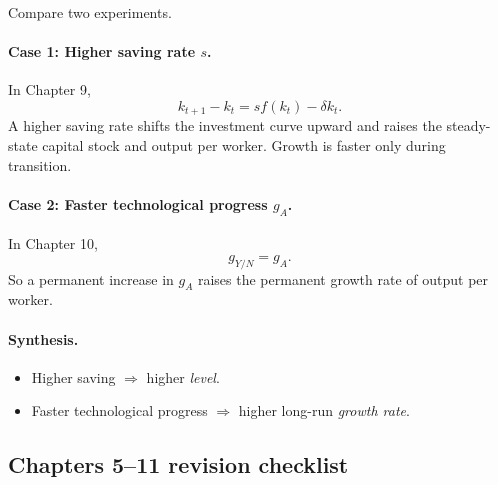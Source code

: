 \documentclass[12pt]{article}
\begin{document}
\begin{examplebox}[title={Worked Example: Higher saving rate versus faster technological progress}]
Compare two experiments.

\paragraph{Case 1: Higher saving rate \(s\).}
In Chapter 9,
\[
k_{t+1}-k_t=s f(k_t)-\delta k_t.
\]
A higher saving rate shifts the investment curve upward and raises the steady-state capital stock and output per worker. Growth is faster only during transition.

\paragraph{Case 2: Faster technological progress \(g_A\).}
In Chapter 10,
\[
g_{Y/N}=g_A.
\]
So a permanent increase in \(g_A\) raises the permanent growth rate of output per worker.

\paragraph{Synthesis.}
\begin{itemize}[leftmargin=1.5em]
\item Higher saving \(\Rightarrow\) higher \emph{level}.
\item Faster technological progress \(\Rightarrow\) higher long-run \emph{growth rate}.
\end{itemize}
\end{examplebox}

\subsection{Chapters 5--11 revision checklist}
\end{document}

